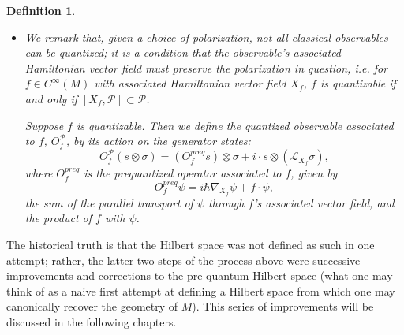 \documentclass{tufte-handout}
\newtheorem{defn}{Definition}
\begin{document}
\begin{defn}
\begin{itemize}
The space of states is defined to be $\mathbb{P}\mathcal{H}$, the projectivization of $\mathcal{H}$.

\item We remark that, given a choice of polarization, not all classical observables can be quantized; it is a condition that the observable's associated Hamiltonian vector field must preserve the polarization in question, i.e. for $f \in C^\infty(M)$ with associated Hamiltonian vector field $X_f$, $f$ is quantizable if and only if $[X_f,\mathcal{P}] \subset \mathcal{P}$.

Suppose $f$ is quantizable. Then we define the \emph{quantized observable} associated to $f$, $O^\mathcal{P}_f$, by its action on the generator states:
$$
O^\mathcal{P}_f(s \otimes \sigma) = (O^{preq}_f s) \otimes \sigma + i \cdot s \otimes (\mathcal{L}_{X_f}\sigma),
$$
where $O^{preq}_f$ is the prequantized operator associated to $f$, given by
$$
O^{preq}_f \psi = i\hbar\nabla_{X_f}\psi + f\cdot\psi,
$$
the sum of the parallel transport of $\psi$ through $f$'s associated vector field, and the product of $f$ with $\psi$.
\end{itemize}
\end{defn}

The historical truth is that the Hilbert space was not defined as such in one attempt; rather, the latter two steps of the process above were successive improvements and corrections to the pre-quantum Hilbert space (what one may think of as a naive first attempt at defining a Hilbert space from which one may canonically recover the geometry of $M$). This series of improvements will be discussed in the following chapters.

\end{document}
